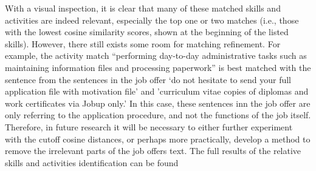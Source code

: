 With a visual inspection, it is clear that many of these matched skills and activities are indeed relevant, especially the top one or two matches (i.e., those with the lowest cosine similarity scores, shown at the beginning of the listed skills). However, there still exists some room for matching refinement. For example, the activity match ``performing day-to-day administrative tasks such as maintaining information files and processing paperwork'' is best matched with the sentence from the sentences in the job offer `do not hesitate to send your full application file with motivation file' and 'curriculum vitae copies of diplomas and work certificates via Jobup only.' In this case, these sentences inn the job offer are only referring to the application procedure, and not the functions of the job itself. Therefore, in future research it will be necessary to either further experiment with the cutoff cosine distances, or perhaps more practically, develop a method to remove the irrelevant parts of the job offers text. The full results of the relative skills and activities identification can be found 
